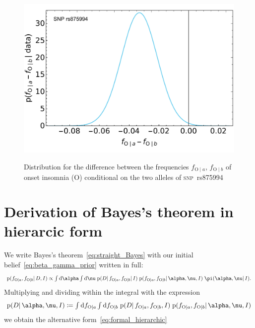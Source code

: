 \documentclass[\ifafour a4paper,12pt,\else a5paper,10pt,\fi%
onecolumn,oneside,article,%
british%
]{memoir}
\theoremstyle{remark}
\theoremstyle{innote}
\newcommand*{\di}{\mathrm{d}}%
\newcommand*{\defd}{\coloneqq}
\newcommand*{\pf}{\mathrm{p}}%
\renewcommand*{\|}{\mathpunct{|}}
\newcommand*{\tint}{\begingroup\textstyle\int\endgroup\nolimits}
\newcommand*{\snp}{\textsc{snp}}
\newcommand*{\yD}{D}
\newcommand*{\yI}{I}
\newcommand*{\ya}{a}
\newcommand*{\yb}{b}
\newcommand*{\ysA}{\textrm{O}}%
\newcommand*{\dbeta}{\betaup}
\newcommand*{\dA}{\pi}
\newcommand*{\yA}{\alpha}
\newcommand*{\yq}{\nu}
\begin{document}
\begin{figure}[b!]%
 \centering\includegraphics[width=0.75\linewidth]{difference_symA_snp6.pdf}\\
 \caption{Distribution for the difference between the frequencies
   $f_{\ysA\|\ya}$, $f_{\ysA\|\yb}$ of onset insomnia ($\ysA$) conditional on
   the two alleles of \snp\ rs875994}\label{fig:example_difference_distributions}
\end{figure}%

\newpage
\appendix


\section{Derivation of Bayes's theorem in hierarcic form}
\label{sec:bayes_hierarcic}

We write Bayes's theorem~\eqref{eq:straight_Bayes} with our initial
belief~\eqref{eq:beta_gamma_prior} written in full:
\begin{equation}
  \label{eq:straight_Bayes_full_prior}
  \pf(f_{\ysA\|\ya}, f_{\ysA\|\yb} \| \yD, \yI)
  \propto
  \tint\di\yA\tint\di\yq\;
    \pf(\yD \| f_{\ysA\|\ya}, f_{\ysA\|\yb} \| \yI)\;
 \pf(f_{\ysA\|\ya}, f_{\ysA\|\yb} \|\yA,\yq, \yI)\;
  \dA(\yA,\yq \|\yI).
\end{equation}
Multiplying and dividing within the integral with the expression
\begin{equation}
  \label{eq:def_Aq_given_data}
    \pf(\yD \|\yA,\yq,\yI)\defd
\tint\di f_{\ysA\|\ya}\tint\di f_{\ysA\|\yb}\;
  \pf(\yD \|f_{\ysA\|\ya}, f_{\ysA\|\yb}, \yI)\;
  \pf(f_{\ysA\|\ya}, f_{\ysA\|\yb}\| \yA,\yq,\yI)
\end{equation}
we obtain the alternative form~\eqref{eq:formal_hierarchic}
\end{document}
